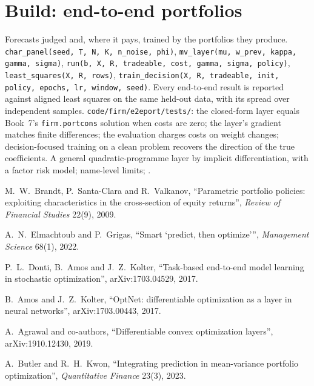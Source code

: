 \section{Build: end-to-end portfolios}\label{bld:ml:from-prediction-to-portfolio:e2eport}

\begin{build}
 Forecasts judged and, where it pays, trained by the portfolios they produce.
 \texttt{char\_panel(seed, T, N, K, n\_noise, phi)}, \texttt{mv\_layer(mu, w\_prev, kappa, gamma, sigma)},
\texttt{run(b, X, R, tradeable, cost, gamma, sigma, policy)}, \texttt{least\_squares(X, R, rows)},
\texttt{train\_decision(X, R, tradeable, init, policy, epochs, lr, window, seed)}.
 Every end-to-end result is reported against aligned least squares on the same held-out data, with its spread over
independent samples.
 \texttt{code/firm/e2eport/tests/}: the closed-form layer equals Book~7's \texttt{firm.portcons}
solution when costs are zero; the layer's gradient matches finite differences; the evaluation charges costs on weight changes;
decision-focused training on a clean problem recovers the direction of the true coefficients.
 A general quadratic-programme layer by implicit differentiation, with a factor risk model; name-level limits;
.
\end{build}

\begin{omsources}
\item M.~W.~Brandt, P.~Santa-Clara and R.~Valkanov, ``Parametric portfolio policies: exploiting characteristics in the
cross-section of equity returns'', \emph{Review of Financial Studies} 22(9), 2009.
\item A.~N.~Elmachtoub and P.~Grigas, ``Smart `predict, then optimize''', \emph{Management Science} 68(1), 2022.
\item P.~L.~Donti, B.~Amos and J.~Z.~Kolter, ``Task-based end-to-end model learning in stochastic optimization'',
arXiv:1703.04529, 2017.
\item B.~Amos and J.~Z.~Kolter, ``OptNet: differentiable optimization as a layer in neural networks'', arXiv:1703.00443, 2017.
\item A.~Agrawal and co-authors, ``Differentiable convex optimization layers'', arXiv:1910.12430, 2019.
\item A.~Butler and R.~H.~Kwon, ``Integrating prediction in mean-variance portfolio optimization'', \emph{Quantitative Finance}
23(3), 2023.
\end{omsources}

